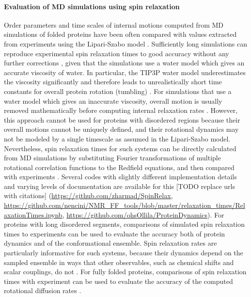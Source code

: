 \documentclass[9pt,review]{livecoms}
\begin{document}
\paragraph{Evaluation of MD simulations using spin relaxation}

Order parameters and time scales of internal motions computed from MD simulations of folded proteins have been often compared with values extracted from experiments using the Lipari-Szabo model \cite{lipari_protein_1982,best_determination_2004,showalter_toward_2007,showalter_validation_2007,maragakis_microsecond_2008,trbovic_structural_2008,fenwick_classic_2016}.
Sufficiently long simulations \cite{bowman_accurately_2016} can reproduce experimental spin relaxation times to good accuracy without any further corrections \cite{virtanen_heterogeneous_2020}, given that the simulations use a water model which gives an accurate viscosity of water.
In particular, the TIP3P water model \cite{jorgensen_comparison_1983} underestimates the viscosity significantly and therefore leads to unrealistically short time constants for overall protein rotation (tumbling) \cite{wong_evaluating_2008}.
For simulations that use a water model which gives an inaccurate viscosity, overall motion is usually removed mathematically before computing internal relaxation rates \cite{prompers_general_2002,wong_evaluating_2008,anderson_rotational_2012,chen_ab_2018,hoffmann_accurate_2018,ollila_rotational_2018}.
However, this approach cannot be used for proteins with disordered regions because their overall motions cannot be uniquely defined, and their rotational dynamics may not be modeled by a single timescale as assumed in the Lipari-Szabo model.
Nevertheless, spin relaxation times for such systems can be directly calculated from MD simulations by substituting Fourier transformations of multiple rotational correlation functions to the Redfield equations, and then compared with experiments \cite{chen_ab_2018,ollila_rotational_2018,hoffmann_predicting_2020,virtanen_heterogeneous_2020}.
Several codes with slightly different implementation details and varying levels of documentation are available for this [TODO replace urls with citations] (\url{https://github.com/zharmad/SpinRelax}, \url{https://github.com/nencini/NMR_FF_tools/blob/master/relaxation_times/RelaxationTimes.ipynb}, \url{https://github.com/ohsOllila/ProteinDynamics}).
For proteins with long disordered segments, comparisons of simulated spin relaxation times to experiments can be used to evaluate the accuracy both of protein dynamics and of the conformational ensemble.
Spin relaxation rates are particularly informative for such systems, because their dynamics depend on the sampled ensemble in ways that other observables, such as chemical shifts and scalar couplings, do not \cite{virtanen_heterogeneous_2020}.
For fully folded proteins, comparisons of spin relaxation times with experiment can be used to evaluate the accuracy of the computed rotational diffusion rates \cite{virtanen_heterogeneous_2020}.
\end{document}
